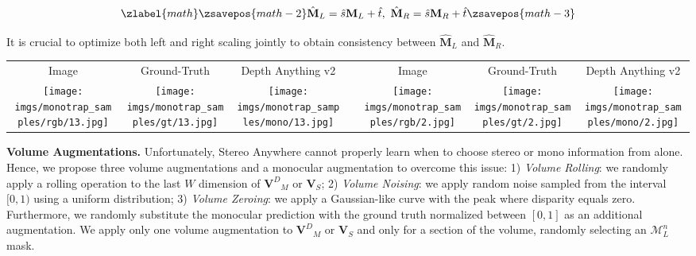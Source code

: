 \documentclass[10pt,twocolumn,letterpaper]{article}
\newcommand{\method}[0]{Stereo Anywhere\xspace}
\newcommand{\dataset}[0]{MonoTrap\xspace}
\begin{document}
\begin{equation}
\zlabel{math}
    \zsavepos{math-2}
    \hat{\mathbf{M}}_L = \hat{s}\mathbf{M}_L + \hat{t},\ \hat{\mathbf{M}}_R = \hat{s}\mathbf{M}_R + \hat{t}
    \label{eq:scaling_op}
    \zsavepos{math-3}\end{equation}


It is crucial to optimize both left and right scaling jointly to obtain consistency between $\hat{\mathbf{M}}_L$ and $\hat{\mathbf{M}}_R$.

\begin{figure*}[t]
    \centering
    \renewcommand{\tabcolsep}{1pt}
    \hspace*{-0.5cm}\begin{tabular}{ccccccc}
    \small Image
    & \small Ground-Truth
    & \small Depth Anything v2 \cite{depth_anything_v2} &
    & \small Image
    & \small Ground-Truth
    & \small Depth Anything v2 \cite{depth_anything_v2} \\
    \texttt{[image: imgs/monotrap\_samples/rgb/13.jpg]}
    &\texttt{[image: imgs/monotrap\_samples/gt/13.jpg]}
    &\texttt{[image: imgs/monotrap\_samples/mono/13.jpg]}
    & \hspace{0.1cm} &
    \texttt{[image: imgs/monotrap\_samples/rgb/2.jpg]}
    &\texttt{[image: imgs/monotrap\_samples/gt/2.jpg]}
    &\texttt{[image: imgs/monotrap\_samples/mono/2.jpg]}
    \\
    \end{tabular}

    \caption{\textbf{Samples from \dataset Dataset.} We report two scenes featured in our dataset, showing the left image, the ground-truth depth, and the predictions by Depth Anything v2 \cite{depth_anything_v2}, highlighting how it fails in the presence of visual illusions.}\vspace{-0.3cm}
    \label{fig:monotrap}

\end{figure*}

\textbf{Volume Augmentations.} Unfortunately, \method cannot properly learn when to choose stereo or mono information from \cite{mayer2016large} alone.
Hence, we propose three volume augmentations and a monocular augmentation to overcome this issue: 1) \textit{Volume Rolling}: we randomly apply a rolling operation to the last $W$ dimension of ${\mathbf{V}^D}_M$ or ${\mathbf{V}}_S$; 2) \textit{Volume Noising}: we apply random noise sampled from the interval $[0,1)$ using a uniform distribution; 3) \textit{Volume Zeroing}: we apply a Gaussian-like curve with the peak where disparity equals zero. Furthermore, we randomly substitute the monocular prediction with the ground truth normalized between $[0,1]$ as an additional augmentation.
We apply only one volume augmentation to ${\mathbf{V}^D}_M$ or ${\mathbf{V}}_S$ and only for a section of the volume, randomly selecting an $\mathcal{M}_L^n$ mask.
\end{document}
